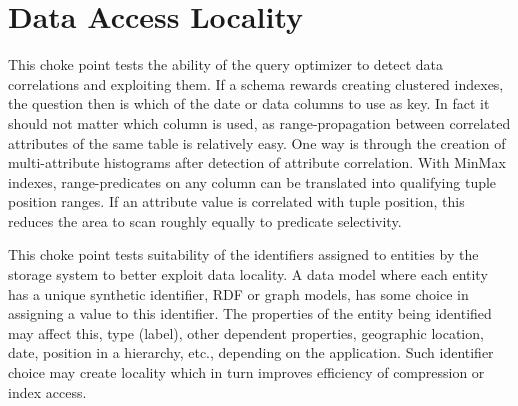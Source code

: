 
\section{Data Access Locality}



This choke point tests the ability of the query optimizer to detect data correlations and exploiting them. If a schema rewards creating clustered indexes, the question then is which of the date or data columns to use as key.
In fact it should not matter which column is used, as range-propagation between correlated attributes of the same table is relatively easy. One way is through the creation of multi-attribute histograms after detection of attribute correlation.
With MinMax indexes, range-predicates on any column can be translated into qualifying tuple position ranges. If an attribute value is correlated with tuple position, this reduces the area to scan roughly equally to predicate selectivity.





This choke point tests suitability of the identifiers assigned to entities by the storage system to better exploit data locality. A data model where each entity has a unique synthetic identifier,
\eg RDF or graph models, has some choice in assigning a value to this identifier.
The properties of the entity being identified may affect this, \eg type (label), other dependent properties,
\eg geographic location, date, position in a hierarchy, etc., depending on the application. Such identifier choice may create locality which in turn improves efficiency of compression or index access.





